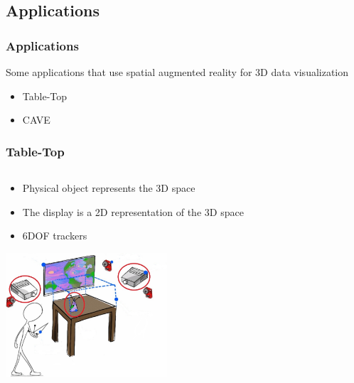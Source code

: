 \documentclass{beamer}
\begin{document}
\subsection{Applications}
\begin{frame}
\frametitle{Applications}
	Some applications that use spatial augmented reality for 3D data visualization   
	\begin{itemize}
		\item Table-Top
		\item CAVE
	\end{itemize}
\end{frame}

\begin{frame}
\frametitle{Table-Top} 
	\begin{columns}
    \begin{column}{0.9\textwidth}
    \begin{itemize}
		\item Physical object represents the 3D space
		\item The display is a 2D representation of the 3D space
		\item 6DOF trackers
	\end{itemize}
	
	\begin{center}
	\includegraphics[width=6cm]{images/TabletopPO}
	
	\cite{3D}
	\end{center}
	\end{column}
    \end{columns}
\end{frame}
\end{document}
